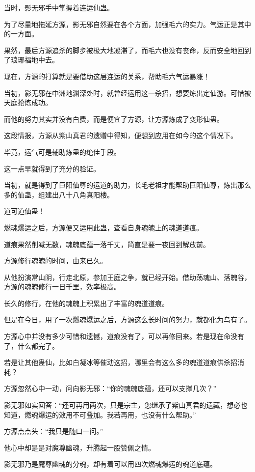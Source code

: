 \begin{this_body}
当时，影无邪手中掌握着连运仙蛊。

为了尽量地拖延方源，影无邪自然要在各个方面，加强毛六的实力。气运正是其中的一方面。

果然，最后方源追杀的脚步被极大地凝滞了，而毛六也没有丧命，反而安全地回到了琅琊福地中去。

现在，方源的打算就是要借助这层连运的关系，帮助毛六气运暴涨！

当初，影无邪在中洲地渊深处时，就曾经运用这一杀招，想要炼出定仙游。可惜被天庭抢炼成功。

而他的努力其实并没有白费，而是便宜了方源，让方源炼成了变形仙蛊。

这段情报，方源从紫山真君的遗赠中得知，便想到应用在如今的这个情况下。

毕竟，运气可是辅助炼蛊的绝佳手段。

这一点早就得到了充分的验证。

当初，就是得到了巨阳仙尊的运道的助力，长毛老祖才能帮助巨阳仙尊，炼出那么多的仙蛊，组建出八十八角真阳楼。

道可道仙蛊！

燃魂爆运之后，方源便又运用此蛊，查看自身魂魄上的魂道道痕。

道痕果然削减无数，魂魄底蕴一落千丈，简直是要一夜回到解放前。

方源修行魂魄的时间，由来已久。

从他扮演常山阴，行走北原，参加王庭之争，就已经开始。借助荡魂山、落魄谷，方源的魂魄修行一日千里，效率极高。

长久的修行，在他的魂魄上积累出了丰富的魂道道痕。

但是在今日，用了一次燃魂爆运之后，方源这么长时间的努力，就都化为乌有了。

方源心中并没有多少可惜和遗憾，道痕没有了，可以再修回来。若是现在命没有了，什么都完了。

若是让其他蛊仙，比如白凝冰等催动这招，哪里会有这么多的魂道道痕供杀招消耗？

方源忽然心中一动，问向影无邪：“你的魂魄底蕴，还可以支撑几次？”

影无邪如实回答：“还可再用两次，只是宗主，您继承了紫山真君的遗藏，想必也知道，燃魂爆运的效用不可叠加。我若再用，也没有什么帮助。”

方源点点头：“我只是随口一问。”

他心中却是是对魔尊幽魂，升腾起一股赞佩之情。

影无邪乃是魔尊幽魂的分魂，却有着可以用四次燃魂爆运的魂道底蕴。


\end{this_body}
